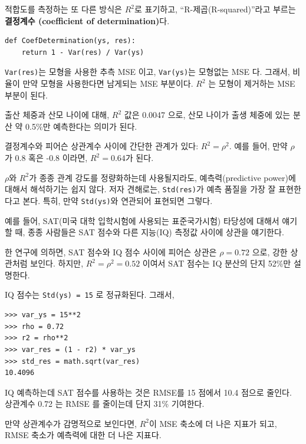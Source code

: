 적합도를 측정하는 또 다른 방식은 $R^2$로 표기하고, ``R-제곱(R-squared)''라고 부르는 {\bf 결정계수 (coefficient of determination)}다.


\begin{verbatim}
def CoefDetermination(ys, res):
    return 1 - Var(res) / Var(ys)
\end{verbatim}

{\tt Var(res)}는 모형을 사용한 추측 MSE 이고, {\tt Var(ys)}는 
모형없는 MSE 다. 그래서, 비율이 만약 모형을 사용한다면 남게되는 MSE 부분이다. $R^2$ 는 모형이 제거하는 MSE 부분이 된다.

출산 체중과 산모 나이에 대해, $R^2$ 값은 0.0047 으로, 산모 나이가 출생 체중에 있는 분산 약 0.5\%만 예측한다는 의미가 된다.

결정계수와 피어슨 상관계수 사이에 간단한 관계가 있다: $R^2 = \rho^2$.
예를 들어, 만약 $\rho$ 가 0.8 혹은 -0.8 이라면, $R^2 = 0.64$가 된다.

$\rho$와 $R^2$가 종종 관계 강도를 정량화하는데 사용될지라도,
예측력(predictive power)에 대해서 해석하기는 쉽지 않다.
저자 견해로는, {\tt Std(res)}가 예측 품질을 가장 잘 표현한다고 본다. 특히, 만약 {\tt Std(ys)}와 연관되어 표현되면 그렇다. 


예를 들어, SAT(미국 대학 입학시험에 사용되는 표준국가시험) 타당성에 대해서 얘기할 때, 종종 사람들은 SAT 점수와 다른 지능(IQ) 측정값 사이에 상관을 얘기한다.

한 연구에 의하면, SAT 점수와 IQ 점수 사이에 피어슨 상관은 $\rho=0.72$ 으로, 강한 상관처럼 보인다.
하지만, $R^2 = \rho^2 = 0.52$ 이여서 SAT 점수는 IQ 분산의 단지 52\%만 설명한다.

IQ 점수는 {\tt Std(ys) = 15} 로 정규화된다. 그래서, 

\begin{verbatim}
>>> var_ys = 15**2
>>> rho = 0.72
>>> r2 = rho**2
>>> var_res = (1 - r2) * var_ys
>>> std_res = math.sqrt(var_res)
10.4096
\end{verbatim}

IQ 예측하는데 SAT 점수를 사용하는 것은 RMSE를 15 점에서 10.4 점으로 줄인다. 상관계수 0.72 는 RMSE 를 줄이는데 단지 31\% 기여한다.

만약 상관계수가 감명적으로 보인다면, $R^2$이 MSE 축소에 더 나은 지표가 되고, RMSE 축소가 예측력에 대한 더 나은 지표다.

